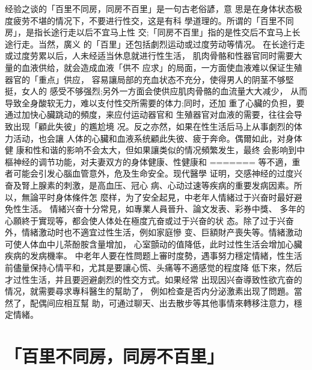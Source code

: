 \documentclass[12pt,UTF8]{ctexbook}
\begin{document}
经验之谈的「百里不同房，同房不百里」是一句古老俗諺，意
思是在身体状态极度疲劳不堪的情况下，不要进行性交，这是有科
學道理的。所谓的「百里不同房」，是指长途行走以后不宜马上性
交;「同房不百里」指的是性交后不宜马上长途行走。当然，廣义
的「百里」还包括劇烈运动或过度劳动等情况。
在长途行走或过度劳累以后，人未经适当休息就进行性生活，
肌肉骨骼和性器官同时需要大量的血液供给，就会造成血液「供不
应求」的局面，一方面使血液难以保证生殖器官的「重点」供应，
容易讓局部的充血状态不充分，使得男人的阴茎不够堅挺，女人的
感受不够强烈;另外一方面会使供应肌肉骨骼的血流量大大减少，
从而导致全身酸软无力，难以支付性交所需要的体力;同时，还加
重了心臟的负担，要通过加快心臟跳动的頻度，来应付运动器官和
生殖器官对血液的需要，往往会导致出现「顧此失彼」的尷尬境
况。反之亦然，如果在性生活后马上从事劇烈的体力活动，也会讓
人体的心臟和血液系统顧此失彼、疲于奔命。偶爾如此，对身体健
康和性和谐的影响不会太大，但如果讓类似的情况頻繁发生，最终
会影响到中樞神经的调节功能，对夫妻双方的身体健康、性健康和
=======
等不適，重者可能会引发心腦血管意外，危及生命安全。现代醫學
证明，交感神经的过度兴奋及腎上腺素的刺激，是高血压、冠心
病、心动过速等疾病的重要发病因素。所以，無論平时身体條件怎
麼样，为了安全起見，中老年人情緒过于兴奋时最好避免性生活。
情緒兴奋十分常見，如專業人員晉升、論文发表、彩券中獎、
多年的心願終于實现等，都会使人体处在極度亢奋或过于兴奋的状
态。除了过于兴奋外，情緒激动时也不適宜过性生活，例如家庭慘
变、巨額財产喪失等。情緒激动可使人体血中儿茶酚胺含量增加，
心室顫动的值降低，此时过性生活会增加心臟疾病的发病機率。
中老年人要在性問题上審时度勢，遇事努力穩定情緒，性生活
前儘量保持心情平和，尤其是要讓心慌、头痛等不適感觉的程度降
低下來，然后才过性生活，并且要迥避劇烈的性交方式。如果经常
出现因兴奋導致性欲亢奋的情况，就需要尋求專科醫生的幫助了，
例如检查是否内分泌激素出现了問題。當然了，配偶间应相互幫
助，可通过聊天、出去散步等其他事情來轉移注意力，穩定情緒。

\section{「百里不同房，同房不百里」}
\end{document}
